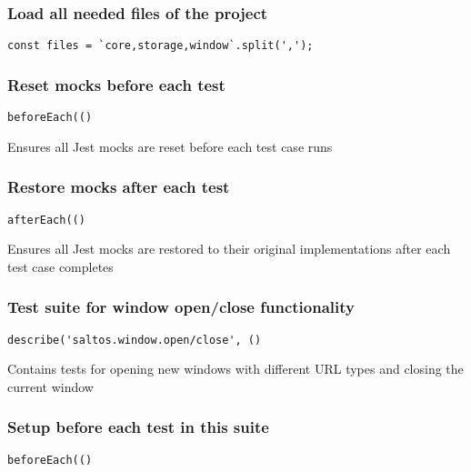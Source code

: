 \documentclass[a4paper]{article}
\begin{document}
\hypertarget{toc719}{}
\subsubsection{Load all needed files of the project}

\begin{lstlisting}
const files = `core,storage,window`.split(',');
\end{lstlisting}

\hypertarget{toc720}{}
\subsubsection{Reset mocks before each test}

\begin{lstlisting}
beforeEach(()
\end{lstlisting}

Ensures all Jest mocks are reset before each test case runs

\hypertarget{toc721}{}
\subsubsection{Restore mocks after each test}

\begin{lstlisting}
afterEach(()
\end{lstlisting}

Ensures all Jest mocks are restored to their original implementations
after each test case completes

\hypertarget{toc722}{}
\subsubsection{Test suite for window open/close functionality}

\begin{lstlisting}
describe('saltos.window.open/close', ()
\end{lstlisting}

Contains tests for opening new windows with different URL types
and closing the current window

\hypertarget{toc723}{}
\subsubsection{Setup before each test in this suite}

\begin{lstlisting}
beforeEach(()
\end{lstlisting}
\end{document}
